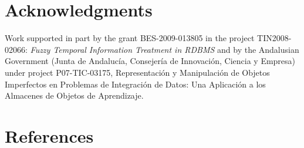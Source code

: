 \documentclass[11pt,twoside]{article}
\def\labart{yourLabel}      %
\begin{document}
\begin{multicols}{2}
%
%
%
%
%

\section*{Acknowledgments}
Work supported in part by the grant BES-2009-013805 in the project TIN2008-02066: \emph{Fuzzy Temporal Information Treatment in RDBMS} and by the Andalusian Government (Junta de Andaluc\'ia, Consejer\'ia de Innovaci\'on, Ciencia y Empresa) under project P07-TIC-03175, Representaci\'on y
Manipulaci\'on de Objetos Imperfectos en Problemas de Integraci\'on de Datos: Una Aplicaci\'on
a los Almacenes de Objetos de Aprendizaje.






\section*{References}



\end{multicols}
\end{document}
